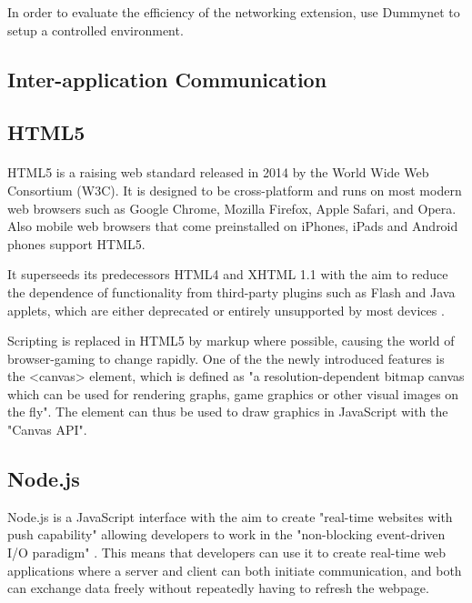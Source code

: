 \documentclass[bsc,frontabs,twoside,singlespacing,parskip,deptreport]{infthesis}     %
\begin{document}
In order to evaluate the efficiency of the networking extension, use Dummynet to setup a controlled environment.

\subsection{Inter-application Communication}

\subsection{HTML5}
\paragraph{}HTML5 is a raising web standard released in 2014 by the World Wide Web Consortium (W3C). It is designed to be cross-platform and runs on most modern web browsers such as Google Chrome, Mozilla Firefox, Apple Safari, and Opera. Also mobile web browsers that come preinstalled on iPhones, iPads and Android phones support HTML5.

It superseeds its predecessors HTML4 and XHTML 1.1 with the aim to reduce the dependence of functionality from third-party plugins such as Flash and Java applets, which are either deprecated or entirely unsupported by most devices \cite{Death_Flash_Java}.

Scripting is replaced in HTML5 by markup where possible, causing the world of browser-gaming to change rapidly. One of the the newly introduced features is the <canvas> element, which is defined as "a resolution-dependent bitmap canvas which can be used for rendering graphs, game graphics or other visual images on the fly"\cite{HTML5_Up_and_Running}. The element can thus be used to draw graphics in JavaScript with the "Canvas API"\cite{Canvas_API}.

\subsection{Node.js}
Node.js is a JavaScript interface with the aim to create "real-time websites with push capability" allowing developers to work in the "non-blocking event-driven I/O paradigm" \cite{Why_Nodejs}. This means that developers can use it to create real-time web applications where a server and client can both initiate communication, and both can exchange data freely without repeatedly having to refresh the webpage.
\end{document}
